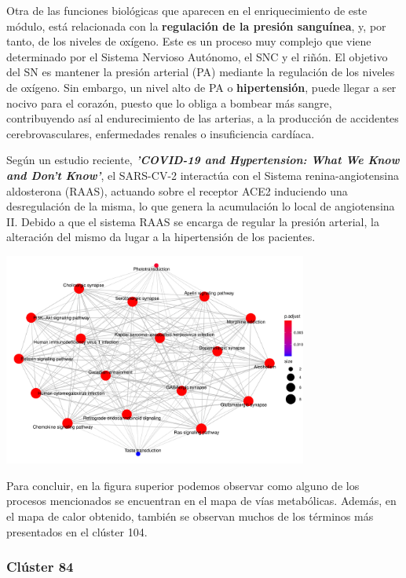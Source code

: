 Otra de las funciones biológicas que aparecen en el enriquecimiento de este módulo, está relacionada con la \textbf{regulación de la presión sanguínea}, y, por tanto, de los niveles de oxígeno. Este es un proceso muy complejo que viene determinado por el Sistema Nervioso Autónomo, el SNC y el riñón. El objetivo del SN es mantener la presión arterial (PA) mediante la regulación de los niveles de oxígeno. Sin embargo, un nivel alto de PA o \textbf{hipertensión}, puede llegar a ser nocivo para el corazón, puesto que lo obliga a bombear más sangre, contribuyendo así al endurecimiento de las arterias, a la producción de accidentes cerebrovasculares, enfermedades renales o insuficiencia cardíaca.

Según un estudio reciente, \textbf{\textit{'COVID-19 and Hypertension: What We Know and Don't Know'}}, el SARS-CV-2 interactúa con el Sistema renina-angiotensina aldosterona (RAAS), actuando sobre el receptor ACE2 induciendo una desregulación de la misma, lo que genera la acumulación lo local de angiotensina II.  Debido a que el sistema RAAS se encarga de regular la presión arterial, la alteración del mismo da lugar a la hipertensión de los pacientes.

\begin{center}
\vspace{1ex}
\includegraphics[width=100mm,scale=1]{report/figures/enrichKEGG_enrichmap-BP-104.png}
\vspace{1ex}
\end{center}

Para concluir, en la figura superior podemos observar como alguno de los procesos mencionados se encuentran en el mapa de vías metabólicas. Además, en el mapa de calor obtenido, también se observan muchos de los términos más presentados en el clúster 104.

\subsubsection{Clúster 84}


